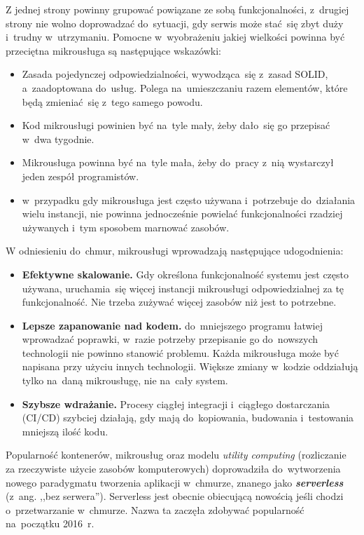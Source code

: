 \documentclass[12pt,a4paper,twoside,titlepage,openright]{book}
\begin{document}
Z jednej strony powinny grupować powiązane ze sobą funkcjonalności, z~drugiej strony nie wolno doprowadzać do~sytuacji, gdy serwis może stać~się zbyt duży i~trudny w~utrzymaniu. Pomocne w~wyobrażeniu jakiej wielkości powinna być przeciętna mikrousługa są następujące wskazówki:
\begin{itemize}
\item Zasada pojedynczej odpowiedzialności, wywodząca~się z~zasad SOLID, a~zaadoptowana do~usług. Polega na~umieszczaniu razem elementów, które będą zmieniać~się z~tego samego powodu. \cite{microservicesWmii}
\item Kod mikrousługi powinien być na~tyle mały, żeby dało~się go przepisać w~dwa tygodnie. \cite{microservicesWmii}
\item Mikrousługa powinna być na~tyle mała, żeby do~pracy z~nią wystarczył jeden zespół programistów. \cite{microservicesSusan}
\item w~przypadku gdy mikrousługa jest często używana i~potrzebuje do~działania wielu instancji, nie powinna jednocześnie powielać funkcjonalności rzadziej używanych i~tym sposobem marnować zasobów. \cite{microservicesSusan}
\end{itemize}

W odniesieniu do~chmur, mikrousługi wprowadzają następujące udogodnienia: \cite{microservicesPacktNetCore, microservicesSusan, microservicesWmii}
\begin{itemize}
\item \textbf{Efektywne skalowanie.} Gdy określona funkcjonalność systemu jest często używana, uruchamia~się więcej instancji mikrousługi odpowiedzialnej za tę funkcjonalność. Nie trzeba zużywać więcej zasobów niż jest to potrzebne.
\item \textbf{Lepsze zapanowanie nad kodem.} do~mniejszego programu łatwiej wprowadzać poprawki, w~razie potrzeby przepisanie go do~nowszych technologii nie powinno stanowić problemu. Każda mikrousługa może być napisana przy użyciu innych technologii. Większe zmiany w~kodzie oddziałują tylko na~daną mikrousługę, nie na~cały system.
\item \textbf{Szybsze wdrażanie.} Procesy ciągłej integracji i~ciągłego dostarczania (CI/CD) szybciej działają, gdy mają do~kopiowania, budowania i~testowania mniejszą ilość kodu. 
\end{itemize}

Popularność kontenerów, mikrousług oraz modelu \textit{utility computing} (rozliczanie za rzeczywiste użycie zasobów komputerowych) doprowadziła do~wytworzenia nowego paradygmatu tworzenia aplikacji w~chmurze, znanego jako \textbf{\textit{serverless}} (z~ang. ,,bez serwera''). Serverless jest obecnie obiecującą nowością jeśli chodzi o~przetwarzanie w~chmurze. Nazwa ta zaczęła zdobywać popularność na~początku 2016~r. \cite{ccResearchSpringer}  
\end{document}
